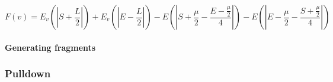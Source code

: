 \documentclass[12pt]{article}
\begin{document}
\begin{equation}
F(v) = E_v(|S + \frac{L}{2}|) + E_v(|E - \frac{L}{2}|) - E(|S + \frac{\mu}{2} - \frac{E- \frac{\mu}{2}}{4}|) - E(|E- \frac{\mu}{2} - \frac{S + \frac{\mu}{2}}{4}|)
\end{equation}

\paragraph{Generating fragments}


\subsubsection*{Pulldown}
\end{document}
